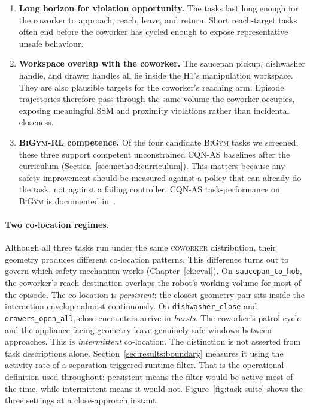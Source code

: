 \documentclass[11pt,a4paper]{report}
\newcommand{\ssm}{SSM}
\newcommand{\bigym}{\textsc{BiGym}}
\newcommand{\cqnas}{CQN-AS}
\newcommand{\coworker}{\textsc{coworker}}
\begin{document}
\begin{enumerate}[topsep=2pt,itemsep=2pt]
\item \textbf{Long horizon for violation opportunity.}
  The tasks last long enough for the coworker to approach, reach,
  leave, and return. Short reach-target tasks often end before the
  coworker has cycled enough to expose representative unsafe
  behaviour.
\item \textbf{Workspace overlap with the coworker.} The saucepan
  pickup, dishwasher handle, and drawer handles all lie inside the
  H1's manipulation workspace. They are also plausible targets for the
  coworker's reaching arm. Episode trajectories therefore pass through
  the same volume the coworker occupies, exposing meaningful \ssm{}
  and proximity violations rather than incidental closeness.
\item \textbf{\bigym{}-RL competence.} Of the four candidate
  \bigym{} tasks we screened, these three support competent
  unconstrained \cqnas{} baselines after the curriculum
  (Section~\ref{sec:method:curriculum}). This matters because any
  safety improvement should be measured against a policy that can
  already do the task, not against a failing controller. \cqnas{}
  task-performance on \bigym{} is documented in~\cite{seo2024cqnas}.
\end{enumerate}

\paragraph{Two co-location regimes.}
Although all three tasks run under the same \coworker{} distribution,
their geometry produces different co-location patterns. This
difference turns out to govern which safety mechanism works
(Chapter~\ref{ch:eval}). On \texttt{saucepan\_to\_hob}, the
coworker's reach destination overlaps the robot's working volume for
most of the episode. The co-location is \emph{persistent}: the closest
geometry pair sits inside the interaction envelope almost
continuously. On \texttt{dishwasher\_close} and
\texttt{drawers\_open\_all}, close encounters arrive in \emph{bursts}.
The coworker's patrol cycle and the appliance-facing geometry leave
genuinely-safe windows between approaches. This is \emph{intermittent}
co-location. The distinction is not asserted from task descriptions
alone. Section~\ref{sec:results:boundary} measures it using the
activity rate of a separation-triggered runtime filter. That is the
operational definition used throughout: persistent means the filter
would be active most of the time, while intermittent means it would
not.
Figure~\ref{fig:task-suite} shows the three settings at a
close-approach instant.
\end{document}

